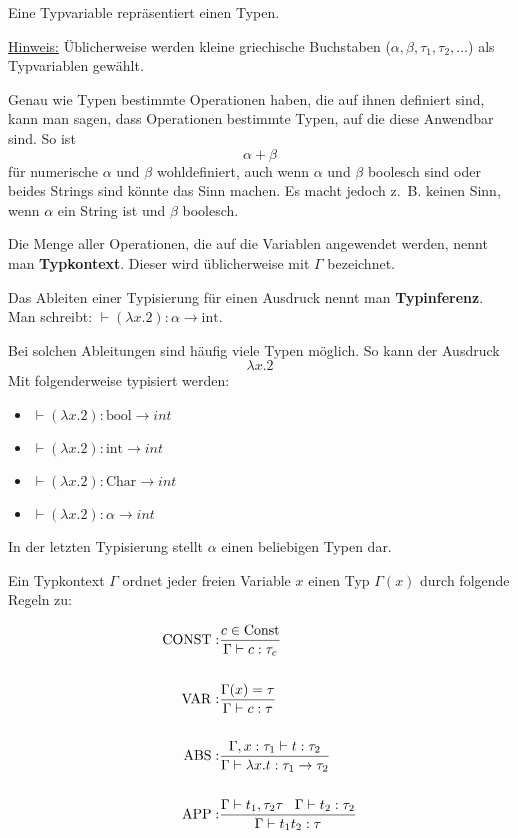 \begin{definition}[Typvariable]%
	Eine Typvariable repräsentiert einen Typen.
\end{definition}

\underline{Hinweis:} Üblicherweise werden kleine griechische Buchstaben ($\alpha, \beta, \tau_1, \tau_2, \dots$) als Typvariablen gewählt.

Genau wie Typen bestimmte Operationen haben, die auf ihnen definiert sind, 
kann man sagen, dass Operationen bestimmte Typen, auf die diese Anwendbar sind. So ist
\[\alpha+\beta\]
für numerische $\alpha$ und $\beta$ wohldefiniert, auch wenn $\alpha$ und $\beta$ boolesch sind
oder beides Strings sind könnte das Sinn machen. Es macht jedoch z.~B. keinen Sinn,
wenn $\alpha$ ein String ist und $\beta$ boolesch.

Die Menge aller Operationen, die auf die Variablen angewendet werden, nennt man
\textbf{Typkontext}. Dieser wird üblicherweise mit $\Gamma$
bezeichnet.

Das Ableiten einer Typisierung für einen Ausdruck nennt man \textbf{Typinferenz}.
Man schreibt: $\vdash(\lambda x.2): \alpha \rightarrow \text{int}$.

Bei solchen Ableitungen sind häufig viele Typen möglich. So kann der Ausdruck
\[\lambda x.2\]
Mit folgenderweise typisiert werden:
\begin{itemize}
	\item $\vdash(\lambda x.2): \text{bool} \rightarrow int$
	\item $\vdash(\lambda x.2): \text{int} \rightarrow int$
	\item $\vdash(\lambda x.2): \text{Char} \rightarrow int$
	\item $\vdash(\lambda x.2): \alpha \rightarrow int$
\end{itemize}

In der letzten Typisierung stellt $\alpha$ einen beliebigen Typen dar.

\begin{definition}\label{def:typsystem-t1}
	Ein Typkontext $\Gamma$ ordnet jeder freien Variable $x$ einen Typ $\Gamma(x)$
	durch folgende Regeln zu:

	\begin{align*}
		\operatorname{CONST}:&\frac{c \in \text{Const}}{\Gamma \vdash c: \tau_c}\\
			   &\\
		\operatorname{VAR}:  &\frac{\Gamma(x) = \tau}{\Gamma \vdash c: \tau}\\
			   &\\
		\operatorname{ABS}:  &\frac{\Gamma, x: \tau_1 \vdash t: \tau_2}{\Gamma \vdash \lambda x. t: \tau_1 \rightarrow \tau_2}\\
			   &\\
		\operatorname{APP}:  &\frac{\Gamma \vdash t_1, \tau_2 \tau\;\;\; \Gamma \vdash t_2: \tau_2}{\Gamma \vdash t_1 t_2: \tau}
	\end{align*}
\end{definition}



